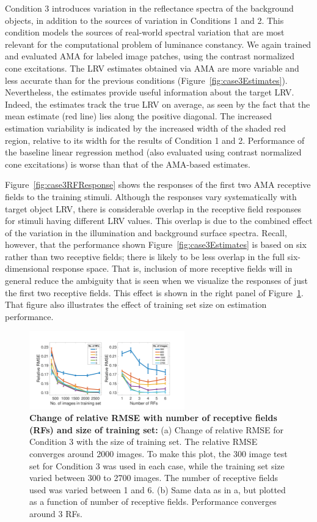 \documentclass{jov}
\begin{document}
Condition 3 introduces variation in the reflectance spectra of the background objects, in addition to the sources of variation in Conditions 1 and 2.
This condition models the sources of real-world spectral variation that are most relevant for the computational problem of luminance constancy.
We again trained and evaluated AMA for labeled image patches, using the contrast normalized cone excitations.
The LRV estimates obtained via AMA are more variable and less accurate than for the previous conditions (Figure~\ref{fig:case3Estimates}).
Nevertheless, the estimates provide useful information about the target LRV.
Indeed, the estimates track the true LRV on average, as seen by the fact that the mean estimate (red line) lies along the positive diagonal.
The increased estimation variability is indicated by the increased width of the shaded red region, relative to its width for the results of Condition 1 and 2.
Performance of the baseline linear regression method (also evaluated using contrast normalized cone excitations) is worse than that of the AMA-based estimates.

Figure~\ref{fig:case3RFResponse} shows the responses of the first two AMA receptive fields to the training stimuli.
Although the responses vary systematically with target object LRV, there is considerable overlap in the receptive field responses for stimuli having different LRV values.
This overlap is due to the combined effect of the variation in the illumination and background surface spectra.
Recall, however, that the performance shown Figure~\ref{fig:case3Estimates} is based on six rather than two receptive fields;
there is likely to be less overlap in the full six-dimensional response space.
That is, inclusion of more receptive fields will in general reduce the ambiguity that is seen when we visualize the responses of just the first two receptive fields.
This effect is shown in the right panel of Figure~\ref{fig:RMSEvsRF}.
That figure also illustrates the effect of training set size on estimation performance. 

\begin{figure}
\centering
\includegraphics[width=0.6\textwidth]{../FiguresDraft5/Figure13/Figure13.pdf}
\caption{{\bf Change of relative RMSE with number of receptive fields (RFs) and size of training set:} (a) Change of relative RMSE for Condition 3 with the size of training set. The relative RMSE converges around 2000 images. To make this plot, the 300 image test set for Condition 3 was used in each case, while the training set size varied between 300 to 2700 images. The number of receptive fields used was varied between 1 and 6. (b) Same data as in a, but plotted as a function of number of receptive fields. Performance converges around 3 RFs.}
 \label{fig:RMSEvsRF}
\end{figure}
\end{document}

